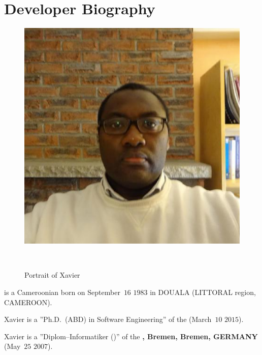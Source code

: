\section{Developer Biography}\label{chap:biography}
\vspace{-0.9em}
\begin{figure}[!htpb]
\centering
\includegraphics[scale=0.35]{../../francais/images/XavierNOUNDOU-2}
\caption{Portrait of Xavier}~\label{fig:xaviernoumbis}
\end{figure}

\textbf{\myfullacademicname} is a Cameroonian
born on September~$16$ $1983$ in DOUALA (LITTORAL region, CAMEROON).

Xavier is a ''Ph.D.~(ABD) in Software Engineering''
of the  (March~$10$ $2015$).

Xavier is a ''Diplom--Informatiker (\diplinf)'' of
the \textbf{\unibremen, Bremen, Bremen, GERMANY} (May~$25$ $2007$).
